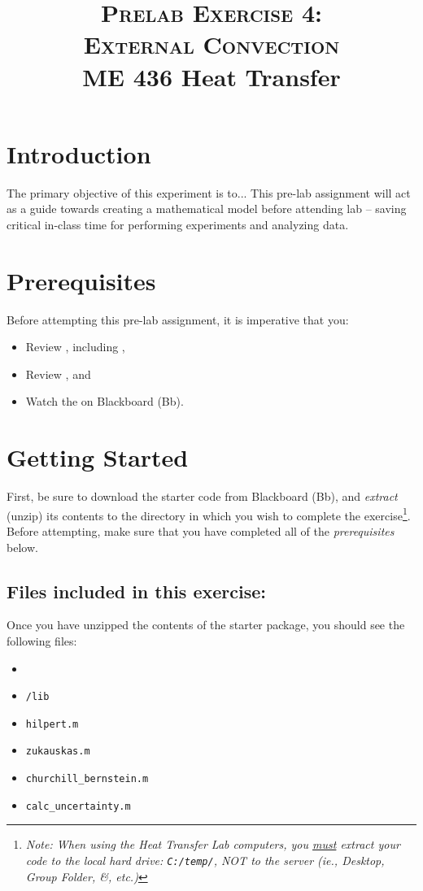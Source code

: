\documentclass[11pt, letterpaper]{article}
\title{ \textsc{Prelab Exercise 4: \\ External Convection} \\ {\large  \color{darkgray} ME 436 Heat Transfer}}
\begin{document}
\date{}
\maketitle
\thispagestyle{firstpage} 

\section*{Introduction}

The primary objective of this experiment is to...
\n
This pre-lab assignment will act as a guide towards creating a mathematical model before attending lab --  saving critical in-class time for performing experiments and analyzing data. 

\section*{Prerequisites}
Before attempting this pre-lab assignment, it is imperative that you:
{\small
\begin{itemize}
    \item Review , including ,
    \item Review , and
    \item Watch the  on Blackboard (Bb).
\end{itemize}
}


\section*{Getting Started}
First, be sure to download the starter code from Blackboard (Bb), and \textit{extract} (unzip) its contents to the directory in which you wish to complete the exercise\footnote{\textit{Note: When using the Heat Transfer Lab computers, you \ul{must} extract your code to the local hard drive: \texttt{C:/temp/}, NOT to the server (ie., Desktop, Group Folder, \&, etc.)}}. Before attempting, make sure that you have completed all of the \textit{prerequisites} below.

\subsection*{Files included in this exercise:}
Once you have unzipped the contents of the starter package, you should see the following files:

\begin{itemize}
\renewcommand\labelitemi{-- }
   \item {}
    \item \texttt{/lib}
\renewcommand\labelitemi{[$\star$]}
    \item \texttt{hilpert.m}
    \item \texttt{zukauskas.m} 
    \item \texttt{churchill\_bernstein.m} 
    \item \texttt{calc\_uncertainty.m} 
\end{itemize}
\end{document}
